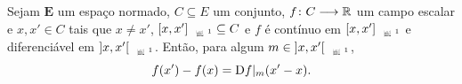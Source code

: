 \begin{proposition}
\label{prop:valor.medio.campo.escalar}
Sejam $\bm E$ um espaço normado, $C \subseteq E$ um conjunto, $f\colon \allowbreak C \longrightarrow \mathbb{R}$ um campo escalar e $x,x' \in C$ tais que $x \neq x'$, $\Sxger{x,x'} \subseteq C$ e $f$ é contínuo em $\Sxger{x,x'}$ e diferenciável em $\Sxgera{x,x'}$. Então, para algum $m \in \Sxgera{x,x'}$,
	\begin{equation*}
	f(x') - f(x) = \mathrm{D} f|_m(x'-x).
	\end{equation*}
\end{proposition}
%
